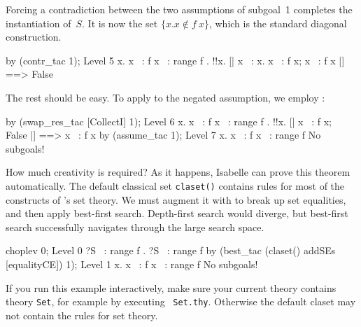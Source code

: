 Forcing a contradiction between the two assumptions of subgoal~1
completes the instantiation of~$S$.  It is now the set $\{x. x\not\in
f~x\}$, which is the standard diagonal construction.
\begin{ttbox}
by (contr_tac 1);
{\out Level 5}
{\out {\ttlbrace}x. x ~: f x{\ttrbrace} ~: range f}
{. !!x. [| x ~: {\ttlbrace}x. x ~: f x{\ttrbrace}; x ~: f x |] ==> False}
\end{ttbox}
The rest should be easy.  To apply  to the negated
assumption, we employ :
\begin{ttbox}
by (swap_res_tac [CollectI] 1);
{\out Level 6}
{\out {\ttlbrace}x. x ~: f x{\ttrbrace} ~: range f}
{. !!x. [| x ~: f x; ~ False |] ==> x ~: f x}
\ttbreak
by (assume_tac 1);
{\out Level 7}
{\out {\ttlbrace}x. x ~: f x{\ttrbrace} ~: range f}
{\out No subgoals!}
\end{ttbox}
How much creativity is required?  As it happens, Isabelle can prove this
theorem automatically.  The default classical set \texttt{claset()} contains rules
for most of the constructs of \HOL's set theory.  We must augment it with
 to break up set equalities, and then apply best-first
search.  Depth-first search would diverge, but best-first search
successfully navigates through the large search space.
\begin{ttbox}
choplev 0;
{\out Level 0}
{\out ?S ~: range f}
{. ?S ~: range f}
\ttbreak
by (best_tac (claset() addSEs [equalityCE]) 1);
{\out Level 1}
{\out {\ttlbrace}x. x ~: f x{\ttrbrace} ~: range f}
{\out No subgoals!}
\end{ttbox}
If you run this example interactively, make sure your current theory contains
theory \texttt{Set}, for example by executing ~{\tt Set.thy}.
Otherwise the default claset may not contain the rules for set theory.

